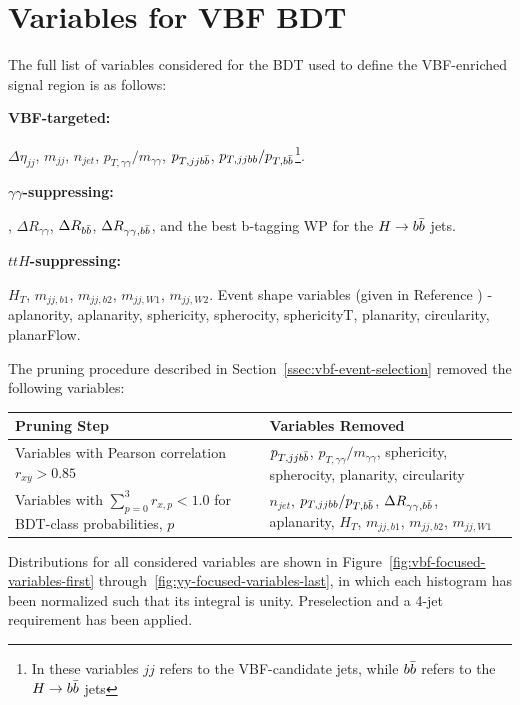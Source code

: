 \chapter{Variables for VBF BDT}\label{app:vbf-variables}

The full list of variables considered for the BDT used to define the VBF-enriched signal region is as follows:

\textbf{VBF-targeted:}

$\Delta \eta_{jj}$, $m_{jj}$, $n_{jet}$, $p_{T, \gamma\gamma}/m_{\gamma\gamma}$, $p_{T,jjb\bar{b}}$, $p_{T,jjbb}/p_{T,b\bar{b}}$\footnote{In these variables $jj$ refers to the VBF-candidate jets, while $b\bar{b}$ refers to the $H\rightarrow b\bar{b}$ jets}.

\textbf{$\gamma \gamma$-suppressing:}

\myybb, $\Delta R_{\gamma\gamma}$, $\Delta R_{b\bar{b}}$, $\Delta R_{\gamma \gamma,b\bar{b}}$, and the best b-tagging WP for the $H\rightarrow b\bar{b}$ jets.

\textbf{$ttH$-suppressing:}

$H_{T}$, $m_{jj,b1}$, $m_{jj,b2}$, $m_{jj,W1}$, $m_{jj,W2}$. Event shape variables (given in Reference \cite{STDM-2011-33}) - aplanority, aplanarity, sphericity, spherocity, sphericityT, planarity, circularity, planarFlow.

The pruning procedure described in Section~\ref{ssec:vbf-event-selection} removed the following variables:

\begin{center}
  \begin{table}[h]
	  \begin{tabularx}{\textwidth}{Y|Y}
	    \hline
	    Pruning Step & Variables Removed  \\
	    \hline
      Variables with Pearson correlation $r_{xy} > 0.85$  &  $p_{T,jjb\bar{b}}$, $p_{T, \gamma\gamma}/m_{\gamma\gamma}$, sphericity, spherocity, planarity, circularity \\
      \hline
	    Variables with $\sum\limits_{p=0}^{3} r_{x,p} < 1.0$ for BDT-class probabilities, $p$ &  $n_{jet}$, $p_{T,jjbb}/p_{T,b\bar{b}}$, $\Delta R_{\gamma \gamma,b\bar{b}}$, aplanarity, $H_{T}$, $m_{jj,b1}$, $m_{jj,b2}$, $m_{jj,W1}$ \\
	    \hline
    \end{tabularx}
  \end{table}
\end{center}


Distributions for all considered variables are shown in Figure~\ref{fig:vbf-focused-variables-first} through~\ref{fig:yy-focused-variables-last}, in which each histogram has been normalized such that its integral is unity. Preselection and a 4-jet requirement has been applied.

